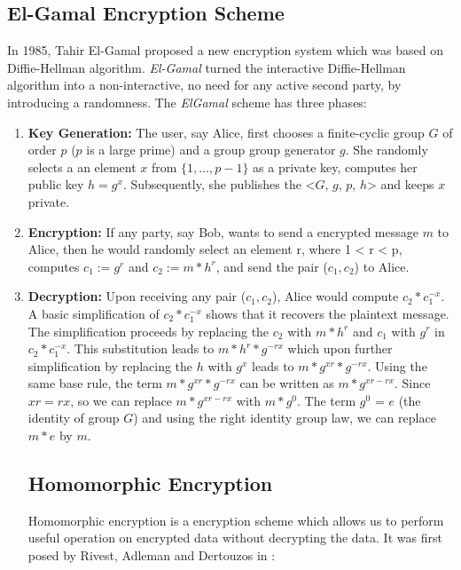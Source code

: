      \subsection{El-Gamal Encryption Scheme}
     \label{sec:elgamal}
     In 1985, Tahir El-Gamal \citep{elgamal1985public} proposed a new encryption system which was based on Diffie-Hellman algorithm. 
     \textit{El-Gamal} turned the interactive  Diffie-Hellman algorithm into a non-interactive, no need for any active second party, by introducing 
     a randomness.  The \textit{ElGamal} scheme has three phases:
     \begin{enumerate}
		\item \textbf{Key Generation:}   
		The user, say Alice, first chooses a finite-cyclic group $G$ of order $p$ ($p$ is a large prime) and a group group generator $g$.
		She randomly selects a an element $x$ from $\{1, \ldots, p-1\}$ as a private key, computes her public key $h = g^{x}$. 
		Subsequently, she publishes 
		the <$G$, $g$, $p$, $h$> and keeps $x$ private. 
		\item \textbf{Encryption:}
		If any party, say Bob, wants to send a encrypted message $m$ to Alice, then he would randomly select an element 
		r, where 1 < r < p, computes $c_{1} := g^{r}$ and $c_{2} := m * h^{r}$, and send the pair ($c_{1}, c_{2}$) to 
		Alice. 
		\item \textbf{Decryption:}
		Upon receiving any pair ($c_{1}, c_{2}$), Alice would compute $c_{2} * c_{1}^{-x}$. A basic simplification of $c_{2} * c_{1}^{-x}$
		shows that it recovers the plaintext message. The simplification proceeds by replacing the $c_{2}$ with 
		$m*h^{r}$ and $c_{1}$ with $g^{r}$ in $c_{2} * c_{1}^{-x}$. This substitution leads to 
		$m * h ^ {r} * g^{-rx}$ which upon further simplification by replacing the $h$ with $g^{x}$
		leads to $m * g^{xr} * g^{-rx}$. Using the same base rule, the term $m * g^{xr} * g^{-rx}$ can be 
		written as $m * g^{xr - rx}$. Since $x  r = r x$, so we 
		can replace $m * g^{xr - rx}$ with $m * g^{0}$. The term $g^{0}$  = $e$ (the identity of group $G$) and using 
		the right identity group law, we can replace $m * e$ by $m$. 
		
		
    
    \subsection{Homomorphic Encryption}
    \label{sec:homomorphic-enc}
	     Homomorphic encryption  is a encryption scheme which allows us to perform useful operation on 
	     encrypted data without decrypting the data.
	     It was first posed by Rivest, Adleman and Dertouzos in \citep{rivest1978data}: 
	     \begin{displayquote}
	     

\end{displayquote}
\end{enumerate}

